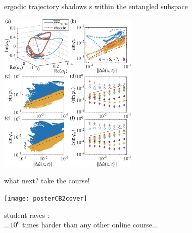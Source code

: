 \begin{frame}{ergodic trajectory shadows \po s within the entangled subspace}
\begin{center}
\includegraphics[width=0.5\textwidth]{../../dimension/ks22vecShadow}
\end{center}
\end{frame}



\begin{frame}{what next? take the course!}
\begin{center}
\texttt{[image: posterCB2cover]}
\end{center}
\vfill
student raves : \\
...$10^6$ times harder than any other online course...
\end{frame}











